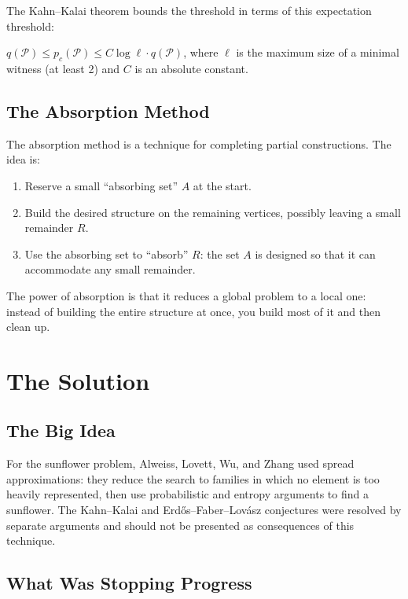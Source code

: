 The Kahn--Kalai theorem bounds the threshold in terms of this expectation threshold:

\begin{fact}
$q(\mathcal{P}) \le p_c(\mathcal{P}) \le C \log \ell \cdot q(\mathcal{P})$, where $\ell$ is the maximum size of a minimal witness (at least 2) and $C$ is an absolute constant.
\end{fact}

\subsection{The Absorption Method}

The absorption method is a technique for completing partial constructions. The idea is:

\begin{enumerate}
\item Reserve a small ``absorbing set'' $A$ at the start.
\item Build the desired structure on the remaining vertices, possibly leaving a small remainder $R$.
\item Use the absorbing set to ``absorb'' $R$: the set $A$ is designed so that it can accommodate any small remainder.
\end{enumerate}

The power of absorption is that it reduces a global problem to a local one: instead of building the entire structure at once, you build most of it and then clean up.

\section{The Solution}

\subsection{The Big Idea}

For the sunflower problem, Alweiss, Lovett, Wu, and Zhang used spread approximations: they reduce the search to families in which no element is too heavily represented, then use probabilistic and entropy arguments to find a sunflower. The Kahn--Kalai and Erd\H{o}s--Faber--Lov\'{a}sz conjectures were resolved by separate arguments and should not be presented as consequences of this technique.

\subsection{What Was Stopping Progress}

